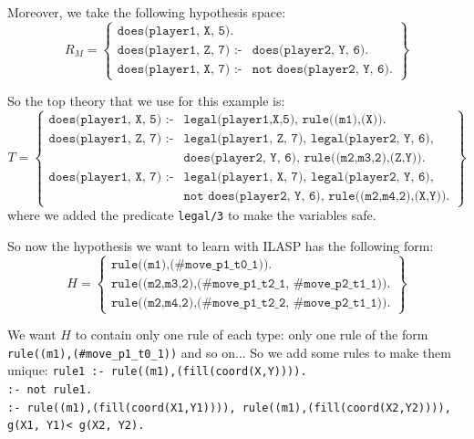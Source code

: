 \documentclass[12pt,twoside]{report}
\begin{document}
Moreover, we take the following hypothesis space:
\[ R_M=
\begin{Bmatrix}
\texttt{does(player1, X, 5).} \\ 
\texttt{does(player1, Z, 7) :-} & \texttt{does(player2, Y, 6).}\\
\texttt{does(player1, X, 7) :-}  & \texttt{not does(player2, Y, 6).}
\end{Bmatrix}
\]

So the top theory that we use for this example is:
\[ T=
\begin{Bmatrix}
\texttt{does(player1, X, 5) :-} & \texttt{legal(player1,X,5), rule((m1),(X)).} \\ 

\texttt{does(player1, Z, 7) :-} & \texttt{legal(player1, Z, 7), legal(player2, Y, 6), }\\ 
 & \texttt{does(player2, Y, 6), rule((m2,m3,2),(Z,Y)).} \\

\texttt{does(player1, X, 7) :-} & \texttt{legal(player1, X, 7), legal(player2, Y, 6), } \\
& \texttt{not does(player2, Y, 6), rule((m2,m4,2),(X,Y)).}
\end{Bmatrix}
\]
where we added the predicate \texttt{legal/3} to make the variables safe.

\bigskip

So now the hypothesis we want to learn with ILASP has the following form:
\[H=
\begin{Bmatrix}
\texttt{rule((m1),(\#move\_p1\_t0\_1)).}\\
\texttt{rule((m2,m3,2),(\#move\_p1\_t2\_1, \#move\_p2\_t1\_1))}.\\
\texttt{rule((m2,m4,2),(\#move\_p1\_t2\_2, \#move\_p2\_t1\_1))}.
\end{Bmatrix}
\]

\bigskip

We want $H$ to contain only one rule of each type: only one rule of the form\\ \texttt{rule((m1),(\#move\_p1\_t0\_1))} and so on... 
So we add some rules to make them unique:\newline
\texttt{rule1 :- rule((m1),(fill(coord(X,Y)))).}\\
\texttt{:- not rule1.}\\
\texttt{:- rule((m1),(fill(coord(X1,Y1)))), rule((m1),(fill(coord(X2,Y2)))), g(X1, Y1)< g(X2, Y2). }\\

\smallskip
\end{document}
